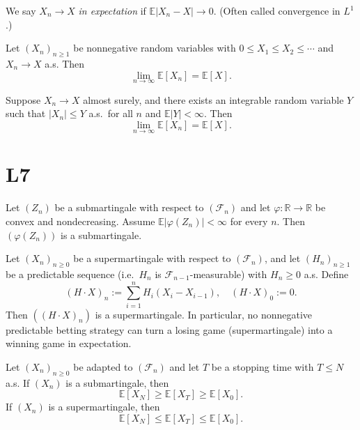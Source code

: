 \documentclass[answers,12pt,addpoints]{exam}
\begin{document}
\begin{definition}
We say $X_n \to X$ \emph{in expectation} if $\mathbb{E}|X_n - X|\to 0$. (Often called convergence in $L^1$.)
\end{definition}

\begin{definition}
Let $(X_n)_{n\ge 1}$ be nonnegative random variables with $0\le X_1 \le X_2 \le \cdots$ and $X_n \to X$ a.s. Then
\[
\lim_{n\to\infty}\mathbb{E}[X_n] = \mathbb{E}[X].
\]
\end{definition}

\begin{definition}
Suppose $X_n \to X$ almost surely, and there exists an integrable random variable $Y$ such that $|X_n|\le Y$ a.s.\ for all $n$ and $\mathbb{E}|Y|<\infty$. Then
\[
\lim_{n\to\infty}\mathbb{E}[X_n] = \mathbb{E}[X].
\]
\end{definition}

\section{L7}

\begin{lemma}
Let $(Z_n)$ be a submartingale with respect to $(\mathcal{F}_n)$ and let $\varphi:\mathbb{R}\to\mathbb{R}$ be convex and nondecreasing. Assume $\mathbb{E}|\varphi(Z_n)|<\infty$ for every $n$. Then $(\varphi(Z_n))$ is a submartingale.
\end{lemma}

\begin{theorem}
Let $(X_n)_{n\ge 0}$ be a supermartingale with respect to $(\mathcal{F}_n)$, and let $(H_n)_{n\ge 1}$ be a predictable sequence (i.e.\ $H_n$ is $\mathcal{F}_{n-1}$-measurable) with $H_n\ge 0$ a.s. Define
\[
(H\cdot X)_n := \sum_{i=1}^n H_i (X_i - X_{i-1}), \quad (H\cdot X)_0 := 0.
\]
Then $((H\cdot X)_n)$ is a supermartingale. In particular, no nonnegative predictable betting strategy can turn a losing game (supermartingale) into a winning game in expectation.
\end{theorem}

\begin{theorem}
Let $(X_n)_{n\ge 0}$ be adapted to $(\mathcal{F}_n)$ and let $T$ be a stopping time with $T\le N$ a.s. If $(X_n)$ is a submartingale, then
\[
\mathbb{E}[X_N] \ge \mathbb{E}[X_T] \ge \mathbb{E}[X_0].
\]
If $(X_n)$ is a supermartingale, then
\[
\mathbb{E}[X_N] \le \mathbb{E}[X_T] \le \mathbb{E}[X_0].
\]
\end{theorem}
\end{document}
